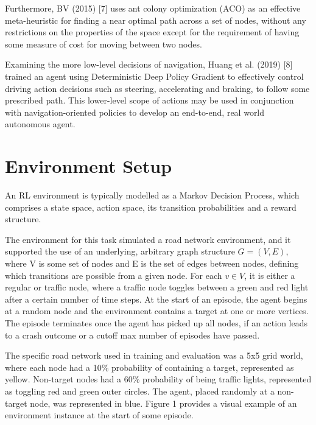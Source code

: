 \documentclass{article}
\begin{document}
	Furthermore, BV (2015) [7] uses ant colony optimization (ACO) as an effective meta-heuristic for finding a near optimal path across a set of nodes, without any restrictions on the properties of the space except for the requirement of having some measure of cost for moving between two nodes.

    Examining the more low-level decisions of navigation, Huang et al. (2019) [8] trained an agent using Deterministic Deep Policy Gradient to effectively control driving action decisions such as steering, accelerating and braking, to follow some prescribed path. This lower-level scope of actions may be used in conjunction with navigation-oriented policies to develop an end-to-end, real world autonomous agent. 
	
	\section{Environment Setup}
	An RL environment is typically modelled as a Markov Decision Process, which comprises a state space, action space, its transition probabilities and a reward structure.
	
	The environment for this task simulated a road network environment, and it supported the use of an underlying, arbitrary graph structure $G = (V, E)$, where V is some set of nodes and E is the set of edges between nodes, defining which transitions are possible from a given node. For each $v\in V$, it is either a regular or traffic node, where a traffic node toggles between a green and red light after a certain number of time steps. At the start of an episode, the agent begins at a random node and the environment contains a target at one or more vertices. The episode terminates once the agent has picked up all nodes, if an action leads to a crash outcome or a cutoff max number of episodes have passed.
	
	The specific road network used in training and evaluation was a 5x5 grid world, where each node had a 10\% probability of containing a target, represented as yellow. Non-target nodes had a 60\% probability of being traffic lights, represented as toggling red and green outer circles. The agent, placed randomly at a non-target node, was represented in blue. Figure 1 provides a visual example of an environment instance at the start of some episode. 
	
\end{document}

